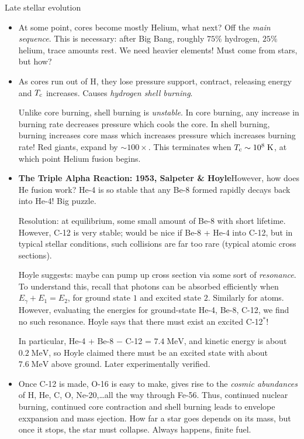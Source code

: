 \documentclass[11pt,
        usenames, %
        dvipsnames %
    ]{article}
\begin{document}
Late stellar evolution
\begin{itemize}
    \item At some point, cores become mostly Helium, what next? Off the
        \emph{main sequence}. This is necessary: after Big Bang, roughly $75\%$
        hydrogen, $25\%$ helium, trace amounts rest. We need heavier elements!
        Must come from stars, but how?

    \item As cores run out of H, they lose pressure support, contract, releasing
        energy and $T_{\rm c}$ increases. Causes \emph{hydrogen shell burning}.

        Unlike core burning, shell burning is \emph{unstable}. In core burning,
        any increase in burning rate decreases pressure which cools the core. In
        shell burning, burning increases core mass which increases pressure
        which increases burning rate! Red giants, expand by $\sim 100\times$.
        This terminates when $T_{\rm c} \sim 10^8\;\mathrm{K}$, at which point
        Helium fusion begins.

    \item \textbf{The Triple Alpha Reaction: 1953, Salpeter \& Hoyle}However,
        how does He fusion work? He-4 is so stable that any Be-8 formed rapidly
        decays back into He-4! Big puzzle.

        Resolution: at equilibrium, some small amount of Be-8 with short
        lifetime. However, C-12 is very stable; would be nice if Be-8 + He-4
        into C-12, but in typical stellar conditions, such collisions are far
        too rare (typical atomic cross sections).

        Hoyle suggests: maybe can pump up cross section via some sort of
        \emph{resonance}. To understand this, recall that photons can be
        absorbed efficiently when $E_\gamma + E_1 = E_2$, for ground state $1$
        and excited state $2$. Similarly for atoms. However, evaluating the
        energies for ground-state He-4, Be-8, C-12, we find no such resonance.
        Hoyle says that there must exist an excited C-12$^*$!

        In particular, He-4 + Be-8 $-$ C-12 = $7.4\;\mathrm{MeV}$, and kinetic
        energy is about $0.2\;\mathrm{MeV}$, so Hoyle claimed there must be an
        excited state with about $7.6\;\mathrm{MeV}$ above ground. Later
        experimentally verified.

    \item Once C-12 is made, O-16 is easy to make, gives rise to the
        \emph{cosmic abundances} of H, He, C, O, Ne-20,\dots all the way through
        Fe-56. Thus, continued nuclear burning, continued core contraction and
        shell burning leads to envelope exxpansion and mass ejection. How far a
        star goes depends on its mass, but once it stops, the star must
        collapse. Always happens, finite fuel.


\end{itemize}
\end{document}

